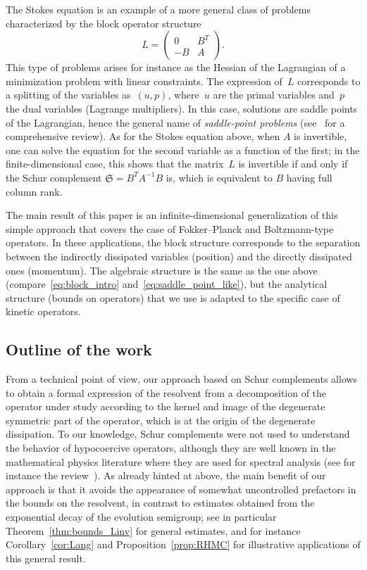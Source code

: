 \documentclass[10pt]{amsart}
\theoremstyle{definition}\newtheorem{defi}[theo]{Definition}\newtheorem{rema}[theo]{Remark}\newtheorem{exam}[theo]{Example}\newtheorem{exem}[theo]{Example}\newtheorem{nota}[theo]{Notation}
\newcommand{\frkS}{\mathfrak{S}}
\begin{document}
The Stokes equation is an example of a more general class of problems characterized by the block operator structure
\begin{equation}\label{eq:block_intro}
L =
\begin{pmatrix}
0 & B^{T}\\
-B & A
\end{pmatrix}.
\end{equation}
This type of problems arises for instance as the Hessian of the Lagrangian of a minimization problem with linear constraints. The expression of~$L$ corresponds to a splitting of the variables as~$(u,p)$, where~$u$ are the primal variables and~$p$ the dual variables (Lagrange multipliers). In this case, solutions are saddle points of the Lagrangian, hence the general name of \emph{saddle-point problems} (see~\cite{benzi2005numerical} for a comprehensive review). As for the Stokes equation above, when $A$ is invertible, one can solve the equation for the second variable as a function of the first; in the finite-dimensional case, this shows that the matrix~$L$ is invertible if and only if the Schur complement $\frkS = B^{T} A^{-1} B$ is, which is equivalent to $B$ having full column rank.

The main result of this paper is an infinite-dimensional generalization of this simple approach that covers the case of Fokker--Planck and Boltzmann-type operators. In these applications, the block structure corresponds to the separation between the indirectly dissipated variables (position) and the directly dissipated ones (momentum). The algebraic structure is the same as the one above (compare~\eqref{eq:block_intro} and~\eqref{eq:saddle_point_like}), but the analytical structure (bounds on operators) that we use is adapted to the specific case of kinetic operators.

\subsection*{Outline of the work}
From a technical point of view, our approach based on Schur complements allows to obtain a formal expression of the resolvent from a decomposition of the operator under study according to the kernel and image of the degenerate symmetric part of the operator, which is at the origin of the degenerate dissipation. To our knowledge, Schur complements were not used to understand the behavior of hypocoercive operators, although they are well known in the mathematical physics literature where they are used for spectral analysis (see for instance the review~\cite{SZ07}). As already hinted at above, the main benefit of our approach is that it avoids the appearance of somewhat uncontrolled prefactors in the bounds on the resolvent, in contrast to estimates obtained from the exponential decay of the evolution semigroup; see in particular Theorem~\ref{thm:bounds_Linv} for general estimates, and for instance Corollary~\ref{cor:Lang} and Proposition~\ref{prop:RHMC} for illustrative applications of this general result.
\end{document}
